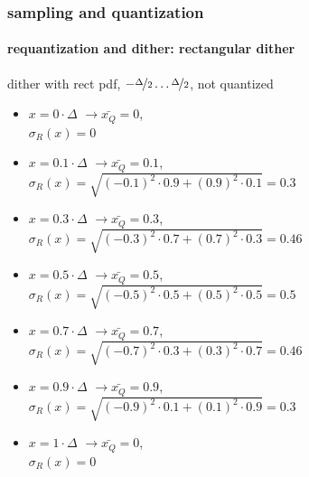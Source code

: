 	\begin{frame}\frametitle{sampling and quantization}\framesubtitle{requantization and dither: rectangular dither}
        \vspace{-5mm}
        dither with rect pdf, $-\nicefrac{\Delta}{2}\ldots \nicefrac{\Delta}{2}$, not quantized
        \begin{itemize}
            \item   $x = 0 \cdot \Delta$ \pause $\rightarrow \bar{x_Q} =0$,\\ $\sigma_R(x) = 0$
            \pause
            \item   $x = 0.1 \cdot \Delta$ \pause $\rightarrow \bar{x_Q} = 0.1 $,\\ $\sigma_R(x) = \sqrt{(-0.1)^2\cdot0.9 + (0.9)^2\cdot0.1} = 0.3$ 
            \pause
            \item   $x = 0.3 \cdot \Delta$ \pause $\rightarrow \bar{x_Q} = 0.3 $,\\ $\sigma_R(x) = \sqrt{(-0.3)^2\cdot0.7 + (0.7)^2\cdot0.3} = 0.46$ 
            \pause
            \item   $x = 0.5 \cdot \Delta$ \pause $\rightarrow \bar{x_Q} = 0.5 $,\\ $\sigma_R(x) = \sqrt{(-0.5)^2\cdot0.5 + (0.5)^2\cdot0.5} = 0.5$ 
            \pause
            \item   $x = 0.7 \cdot \Delta$ \pause $\rightarrow \bar{x_Q} = 0.7 $,\\ $\sigma_R(x) = \sqrt{(-0.7)^2\cdot0.3 + (0.3)^2\cdot0.7} = 0.46$ 
            \pause
            \item   $x = 0.9 \cdot \Delta$ \pause $\rightarrow \bar{x_Q} = 0.9 $,\\ $\sigma_R(x) = \sqrt{(-0.9)^2\cdot0.1 + (0.1)^2\cdot0.9} = 0.3$ 
            \pause
            \item   $x = 1 \cdot \Delta$ \pause $\rightarrow \bar{x_Q} =0$,\\ $\sigma_R(x) = 0$
        \end{itemize}
	\end{frame}	
